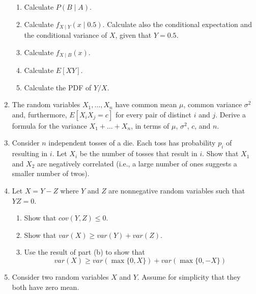 \documentclass[paper=usletter, fontsize=12pt]{article}
\begin{document}
\begin{enumerate}
\begin{enumerate}
            \item Calculate $P(B \mid A)$.

            \item Calculate $f_{X \mid Y}(x \mid 0.5)$. Calculate also the
            conditional expectation and the conditional variance of $X$, given
            that $Y=0.5$.

            \item Calculate $f_{X \mid B}(x)$.

            \item Calculate $E[XY]$.

            \item Calculate the PDF of $Y/X$.

        \end{enumerate}

        \item The random variables $X_1,\ldots,X_n$ have common mean $\mu$,
        common variance $\sigma^2$ and, furthermore, $E[X_iX_j=c]$ for every
        pair of distinct $i$ and $j$. Derive a formula for the variance
        $X_1+\ldots+X_n$, in terms of $\mu$, $\sigma^2$, $c$, and $n$.

        \item Consider $n$ independent tosses of a die. Each toss has
        probability $p_i$ of resulting in $i$. Let $X_i$ be the number of
        tosses that result in $i$. Show that $X_1$ and $X_2$ are negatively
        correlated (i.e., a large number of ones suggests a smaller number of
        twos).

        \item Let $X=Y-Z$ where $Y$ and $Z$ are nonnegative random variables
        such that $YZ=0$.
        \begin{enumerate}

            \item Show that $cov(Y,Z) \le 0$.

            \item Show that $var(X) \ge var(Y)+var(Z)$.

            \item Use the result of part (b) to show that
            \begin{equation*}
                var(X) \ge var(\max\{0,X\})+var(\max\{0,-X\})
            \end{equation*}

        \end{enumerate}

        \item Consider two random variables $X$ and $Y$. Assume for simplicity
        that they both have zero mean.
        \begin{enumerate}


\end{enumerate}
\end{enumerate}
\end{document}
